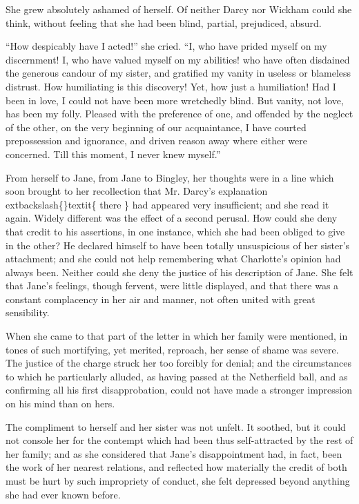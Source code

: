 \documentclass[10pt]{book}
\begin{document}
   She grew absolutely ashamed of herself. Of neither
   Darcy nor Wickham
could she think, without feeling that she had been blind, partial,
prejudiced, absurd.
  

   “How despicably have I acted!” she cried. “I, who have prided myself on
my discernment! I, who have valued myself on my abilities! who have
often disdained the generous candour of my sister, and gratified my
vanity in useless or blameless distrust. How humiliating is this
discovery! Yet, how just a humiliation! Had I been in love, I could not
have been more wretchedly blind. But vanity, not love, has been my
folly. Pleased with the preference of one, and offended by the neglect
of the other, on the very beginning of our acquaintance, I have courted
prepossession and ignorance, and driven reason away where either were
concerned. Till this moment, I never knew myself.”
  

   From herself to Jane, from Jane to Bingley, her thoughts were in a line
which soon brought to her recollection that Mr. Darcy’s explanation
   	extbackslash\{\}textit\{
    there
   \}
   had appeared very insufficient; and she read it again. Widely
different was the effect of a second perusal. How could she deny that
credit to his assertions, in one instance, which she had been obliged to
give in the other? He declared himself to have been totally unsuspicious
of her sister’s attachment; and she could not help remembering what
Charlotte’s opinion had always been. Neither could she deny the justice
of his description of Jane. She felt that Jane’s feelings, though
fervent, were little displayed, and that there was a constant
complacency in her air and manner, not often united with great
sensibility.
  

   When she came to that part of the letter in which her family were
mentioned, in tones of such mortifying, yet merited, reproach, her sense
of shame was severe. The
   justice of the charge struck her too forcibly
for denial; and the circumstances to which he particularly alluded, as
having passed at the Netherfield ball, and as confirming all his first
disapprobation, could not have made a stronger impression on his mind
than on hers.
  

   The compliment to herself and her sister was not unfelt. It soothed, but
it could not console her for the contempt which had been thus
self-attracted by the rest of her family; and as she considered that
Jane’s disappointment had, in fact, been the work of her nearest
relations, and reflected how materially the credit of both must be hurt
by such impropriety of conduct, she felt depressed beyond anything she
had ever known before.
  
\end{document}
